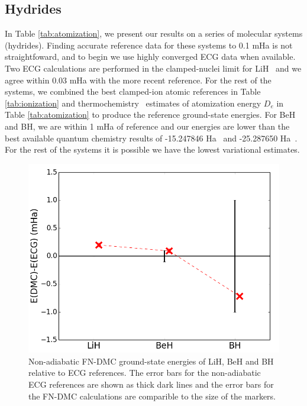 \documentclass[pra,superscriptaddress,groupedaddress,twocolumn]{revtex4}
\begin{document}
\subsection{Hydrides}


In Table \ref{tab:atomization}, we present our results on a series of molecular systems (hydrides). Finding accurate reference data for these systems to 0.1 mHa is not straightfoward, and to begin we use highly converged ECG data when available. Two ECG calculations are performed in the clamped-nuclei limit for LiH~\cite{Cencek_LiH,Adamowicz_LiH} and we agree within 0.03 mHa with the more recent reference. For the rest of the systems, we combined the best clamped-ion atomic references in Table \ref{tab:ionization} and thermochemistry~\cite{Feller_Corrections} estimates of atomization energy $D_e$ in Table \ref{tab:atomization} to produce the reference ground-state energies. For BeH and BH, we are within 1 mHa of reference and our energies are lower than the best available quantum chemistry results of -15.247846 Ha~\cite{Koput_BeH} and -25.287650 Ha~\cite{Miliordos_BH}. For the rest of the systems it is possible we have the lowest variational estimates. %

\begin{figure}[h]
\centering
\includegraphics[scale=.37]{Figures/dia-ECG}
\caption{Non-adiabatic FN-DMC ground-state energies of LiH, BeH and BH relative to ECG references. The error bars for the non-adiabatic ECG references are shown as thick dark lines and the error bars for the FN-DMC calculations are comparible to the size of the markers. \label{fig:dia-ECG}}
\end{figure}
\end{document}
